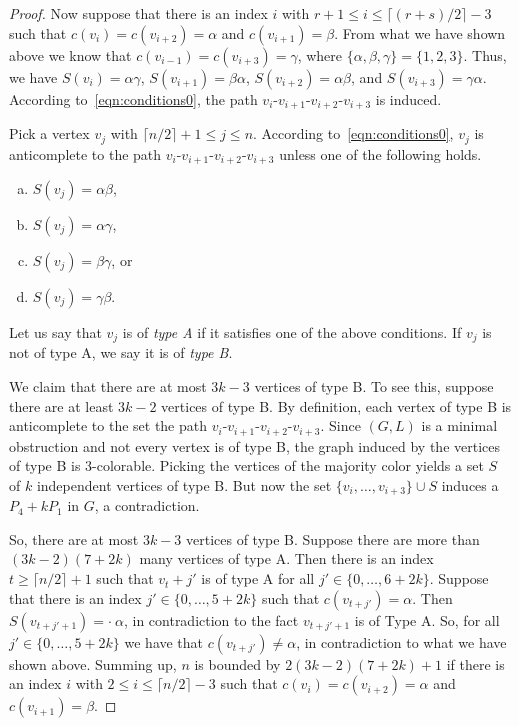 \documentclass[11pt]{article}
\begin{document}
\begin{proof}
Now suppose that there is an index $i$ with $r+1 \le i \le \lceil(r+s)/2\rceil-3$ such that $c(v_i)=c(v_{i+2})=\alpha$ and $c(v_{i+1})=\beta$.
From what we have shown above we know that $c(v_{i-1})=c(v_{i+3})=\gamma$, where $\{\alpha,\beta,\gamma\}=\{1,2,3\}$.
Thus, we have $S(v_i)=\alpha\gamma$,
$S(v_{i+1})=\beta\alpha$,
$S(v_{i+2})=\alpha\beta$, and
$S(v_{i+3})=\gamma\alpha$.
According to~\eqref{eqn:conditions0}, the path $v_i$-$v_{i+1}$-$v_{i+2}$-$v_{i+3}$ is induced.

Pick a vertex $v_j$ with $\lceil n/2\rceil +1\le j \le n$.
According to~\eqref{eqn:conditions0}, $v_j$ is anticomplete to the path $v_i$-$v_{i+1}$-$v_{i+2}$-$v_{i+3}$ unless one of the following holds.
\begin{enumerate}[(a)]
	\item $S(v_j)=\alpha\beta$,
	\item $S(v_j)=\alpha\gamma$,
	\item $S(v_j)=\beta\gamma$, or
	\item $S(v_j)=\gamma\beta$.
\end{enumerate}
Let us say that $v_j$ is of \emph{type A} if it satisfies one of the above conditions.
If $v_j$ is not of type A, we say it is of \emph{type B}.

We claim that there are at most $3k-3$ vertices of type B.
To see this, suppose there are at least $3k-2$ vertices of type B.
By definition, each vertex of type B is anticomplete to the set the path $v_i$-$v_{i+1}$-$v_{i+2}$-$v_{i+3}$.
Since $(G,L)$ is a minimal obstruction and not every vertex is of type B, the graph induced by the vertices of type B is 3-colorable.
Picking the vertices of the majority color yields a set $S$ of $k$ independent vertices of type B.
But now the set $\{v_i,\ldots,v_{i+3}\} \cup S$ induces a $P_4 + k P_1$ in $G$, a contradiction.

So, there are at most $3k-3$ vertices of type B.
Suppose there are more than $(3k-2)(7+2k)$ many vertices of type A.
Then there is an index $t \ge \lceil n/2\rceil+1$ such that $v_t+j'$ is of type A for all $j' \in \{0,\ldots,6+2k\}$.
Suppose that there is an index $j' \in \{0,\ldots,5+2k\}$ such that $c(v_{t+j'}) = \alpha$.
Then $S(v_{t+j'+1})=\cdot~\alpha$, in contradiction to the fact $v_{t+j'+1}$ is of Type A.
So, for all $j' \in \{0,\ldots,5+2k\}$ we have that $c(v_{t+j'}) \neq \alpha$, in contradiction to what we have shown above.
Summing up, $n$ is bounded by $2(3k-2)(7+2k)+1$ if there is an index $i$ with $2 \le i \le \lceil n/2\rceil-3$ such that $c(v_i)=c(v_{i+2})=\alpha$ and $c(v_{i+1})=\beta$.


\end{proof}
\end{document}
